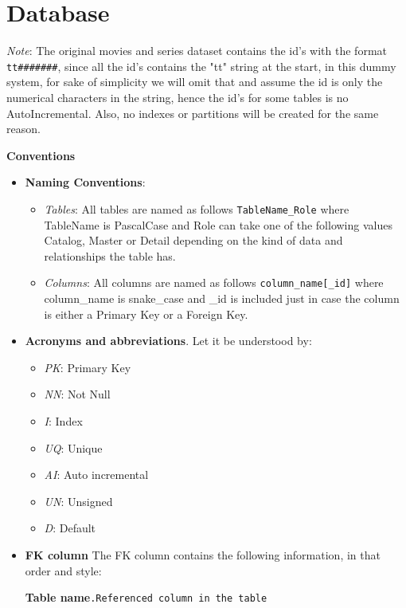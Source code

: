 \documentclass{article}
\newcommand{\mono}{\texttt}
\begin{document}
	\section{Database}
	
	\textit{Note}: The original movies and series dataset contains the id's with the format \mono{tt\#\#\#\#\#\#\#}, since all the id's contains the "tt" string at the start, in this dummy system, for sake of simplicity we will omit that and assume the id is only the numerical characters in the string, hence the id's for some tables is no AutoIncremental. Also, no indexes or partitions will be created for the same reason.
	
	\textbf{Conventions}
	\begin{itemize}
		\item \textbf{Naming Conventions}:
			\begin{itemize}
				\item \textit{Tables}: All tables are named as follows \mono{TableName\_Role} where TableName is PascalCase and Role can take one of the following values Catalog, Master or Detail depending on the kind of data and relationships the table has.
				\item \textit{Columns}: All columns are named as follows \mono{column\_name[\_id]} where column\_name is snake\_case and \_id is included just in case the column is either a Primary Key or a Foreign Key.
				
			\end{itemize}
		
		\item \textbf{Acronyms and abbreviations}. Let it be understood by:
			\begin{itemize}
				\item \textit{PK}: Primary Key
				\item \textit{NN}: Not Null
				\item \textit{I}: Index
				\item \textit{UQ}: Unique
				\item \textit{AI}: Auto incremental
				\item \textit{UN}: Unsigned
				\item \textit{D}: Default				
			\end{itemize}
		
		\item \textbf{FK column} The FK column contains the following information, in that order and style:
		
			 \textbf{Table name}\mono{.Referenced column in the table}\newline
	\end{itemize}
	
\end{document}

